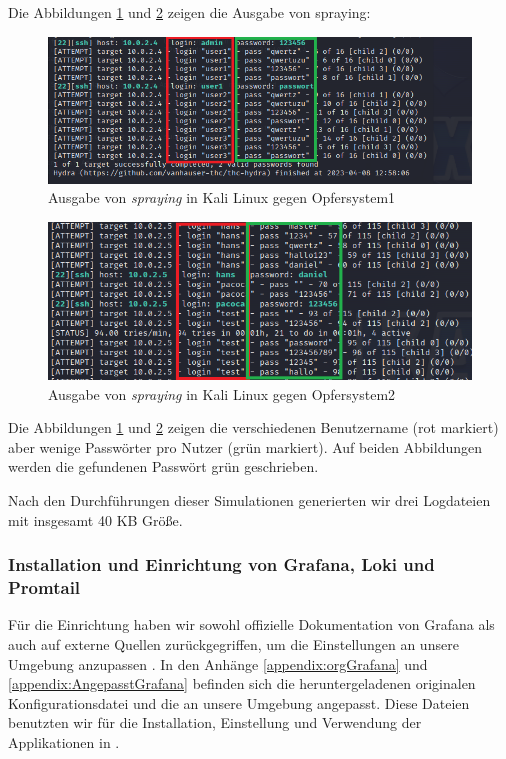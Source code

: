 Die Abbildungen \ref{fig:spraying_opfer1} und \ref{fig:spraying_opfer2} zeigen die Ausgabe von \gls{spraying}:
\begin{figure}[H]
   \centering
   \includegraphics[width=1\textwidth]{assets/Spraying_Kali.png}
   \caption[Ausgabe von \textit{\gls{spraying}} in Kali Linux gegen Opfersystem1]
   {Ausgabe von \textit{\gls{spraying}} in Kali Linux gegen Opfersystem1}
   \label{fig:spraying_opfer1}
   \centering
\end{figure}

\begin{figure}[H]
   \centering
   \includegraphics[width=1\textwidth]{assets/Spraying_Kali2.png}
   \caption[Ausgabe von \textit{\gls{spraying}} in Kali Linux gegen Opfersystem2]
   {Ausgabe von \textit{\gls{spraying}} in Kali Linux gegen Opfersystem2}
   \label{fig:spraying_opfer2}
   \centering
\end{figure}

Die Abbildungen \ref{fig:spraying_opfer1} und \ref{fig:spraying_opfer2} zeigen die verschiedenen Benutzername (rot markiert) aber wenige Passwörter pro Nutzer (grün markiert). Auf beiden Abbildungen werden die gefundenen Passwört grün geschrieben.

Nach den Durchführungen dieser Simulationen generierten wir drei Logdateien mit insgesamt 40 KB Größe.

\newpage
\subsubsection{Installation und Einrichtung von Grafana, Loki und Promtail}
Für die Einrichtung haben wir sowohl offizielle Dokumentation von Grafana als auch auf externe Quellen zurückgegriffen, um die Einstellungen an unsere Umgebung anzupassen \citep{Polinowski_PGL}. In den Anhänge \ref{appendix:orgGrafana} und \ref{appendix:AngepasstGrafana} befinden sich die heruntergeladenen originalen Konfigurationsdatei und die an unsere Umgebung angepasst. Diese Dateien benutzten wir für die Installation, Einstellung und Verwendung der Applikationen in .

